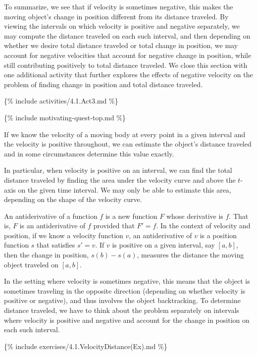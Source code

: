 To summarize, we see that if velocity is sometimes negative, this makes the moving object's change in position different from its distance traveled.  By viewing the intervals on which velocity is positive and negative separately, we may compute the distance traveled on each such interval, and then depending on whether we desire total distance traveled or total change in position, we may account for negative velocities that account for negative change in position, while still contributing positively to total distance traveled.  We close this section with one additional activity that further explores the effects of negative velocity on the problem of finding change in position and total distance traveled.

\{\% include activities/4.1.Act3.md \%\}


\{\% include motivating-quest-top.md \%\}
\begin{summary}
\item If we know the velocity of a moving body at every point in a given interval and the velocity is positive throughout, we can estimate the object's distance traveled and in some circumstances determine this value exactly.
\item In particular, when velocity is positive on an interval, we can find the total distance traveled by finding the area under the velocity curve and above the $t$-axis on the given time interval.  We may only be able to estimate this area, depending on the shape of the velocity curve.
\item An antiderivative of a function $f$ is a new function $F$ whose derivative is $f$.  That is, $F$ is an antiderivative of $f$ provided that $F' = f$.  In the context of velocity and position, if we know a velocity function $v$, an antiderivative of $v$ is a position function $s$ that satisfies $s' = v$.  If $v$ is positive on a given interval, say $[a,b]$, then the change in position, $s(b) - s(a)$, measures the distance the moving object traveled on $[a,b]$.
\item In the setting where velocity is sometimes negative, this means that the object is sometimes traveling in the opposite direction (depending on whether velocity is positive or negative), and thus involves the object backtracking.  To determine distance traveled, we have to think about the problem separately on intervals where velocity is positive and negative and account for the change in position on each such interval.
\end{summary}

\nin \hrulefill

\newpage

\{\% include exercises/4.1.VelocityDistance(Ex).md \%\}

\clearpage
